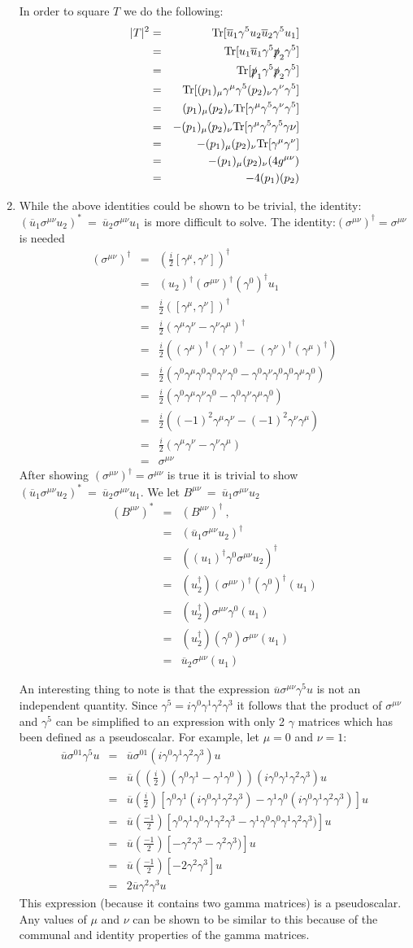 \documentclass[12pt]{article}
\def \bea{\begin{eqnarray}}
\def \eea{\end{eqnarray}}
\def \Tr{{\rm Tr}}
\def \nn{\nonumber}
\def \nl{\nn \\}
\def \ou{\overline{u}}
\def \ga{\gamma}
\def \si{\sigma}
\begin{document}
\begin{enumerate}
In order to square $T$ we do the following:
\bea
|T|^2&=& \Tr[\ou_1 \ga^5 u_2\ou_2 \ga^5 u_1] \\
&=& \Tr[u_1 \ou_1 \ga^5 \slashed{p}_2 \ga^5] \nl
&=& \Tr[\slashed{p}_1 \ga^5 \slashed{p}_2 \ga^5] \nl
&=& \Tr[(p_1)_\mu \ga^\mu \ga^5 (p_2)_\nu \ga^\nu \ga^5] \nl
&=& (p_1)_\mu(p_2)_\nu \Tr[\ga^\mu\ga^5\ga^\nu\ga^5] \nl
&=& -(p_1)_\mu(p_2)_\nu \Tr[\ga^\mu\ga^5\ga^5\ga\nu]\nl
&=& -(p_1)_\mu(p_2)_\nu \Tr[\ga^\mu\ga^\nu]\nl
&=& -(p_1)_\mu(p_2)_\nu (4g^{\mu\nu})\nl
&=& -4(p_1)(p_2) \nl
\eea

\item While the above identities could be shown to be trivial, the identity: $(\ou_1 \si^{\mu\nu} u_2)^* ~=~\ou_2 \si^{\mu\nu} u_1$ is more difficult to solve. The identity:$(\si^{\mu\nu})^\dag =\si^{\mu\nu}$ is needed
\bea
(\si^{\mu\nu})^\dag &=& (\frac{i}{2}[\ga^\mu,\ga^\nu])^\dag \\
&=&(u_2)^\dag (\si^{\mu\nu})^\dag (\ga^0)^\dag u_1 \nl
&=& \frac{i}{2}([\ga^\mu,\ga^\nu])^\dag\nl
&=& \frac{i}{2}(\ga^\mu\ga^\nu-\ga^\nu\ga^\mu)^\dag \nl
&=& \frac{i}{2}((\ga^\mu)^\dag(\ga^\nu)^\dag-(\ga^\nu)^\dag(\ga^\mu)^\dag) \nl
&=& \frac{i}{2}(\ga^0\ga^\mu\ga^0\ga^0\ga^\nu\ga^0-\ga^0\ga^\nu\ga^0\ga^0\ga^\mu\ga^0)\nl
&=& \frac{i}{2}(\ga^0\ga^\mu\ga^\nu\ga^0-\ga^0\ga^\nu \ga^\mu\ga^0)\nl
&=& \frac{i}{2}((-1)^2\ga^\mu\ga^\nu-(-1)^2\ga^\nu \ga^\mu) \nl
&=& \frac{i}{2}(\ga^\mu\ga^\nu-\ga^\nu \ga^\mu)\nl
&=& \si^{\mu\nu}
\eea
After showing $(\si^{\mu\nu})^\dag =\si^{\mu\nu}$ is true it is trivial to show $(\ou_1 \si^{\mu\nu} u_2)^* ~=~\ou_2 \si^{\mu\nu} u_1$.
We let $B^{\mu\nu} ~=~ \ou_1 \si^{\mu\nu} u_2$
\bea
(B^{\mu\nu})^* &=& (B^{\mu\nu})^\dag ~,~~ \\
&=& (\ou_1 \si^{\mu\nu} u_2)^\dag \nl
&=& ((u_1)^\dag \ga^0 \si^{\mu\nu} u_2)^\dag \nl
&=& (u_2^\dag)(\si^{\mu\nu})^\dag (\ga^0)^\dag(u_1)\nl
&=& (u_2^\dag)\si^{\mu\nu}\ga^0(u_1)\nl
&=& (u_2^\dag)(\ga^0)\si^{\mu\nu}(u_1)\nl
&=& \ou_2 \si^{\mu\nu}(u_1)
\eea

An interesting thing to note is that the expression $\ou \si^{\mu\nu} \ga^5 u$ is not an independent quantity. Since $\ga^5 =i\ga^0\ga^1\ga^2\ga^3$ it follows that the product of $\si^{\mu\nu}$ and $\ga^5$ can be simplified to an expression with only 2 $\ga$ matrices which has been defined as a pseudoscalar. For example, let $\mu =0$ and $\nu=1$:
\bea
\ou \si^{01} \ga^5 u &=& \ou \si^{01} (i\ga^0\ga^1\ga^2\ga^3) u \\
&=&  \ou ((\frac{i}{2})(\ga^0\ga^1 -\ga^1\ga^0)) (i\ga^0\ga^1\ga^2\ga^3) u \nl
&=&  \ou (\frac{i}{2})[\ga^0\ga^1(i\ga^0\ga^1\ga^2\ga^3) -\ga^1\ga^0(i\ga^0\ga^1\ga^2\ga^3)] u \nl
&=&  \ou (\frac{-1}{2})[\ga^0\ga^1\ga^0\ga^1\ga^2\ga^3 -\ga^1\ga^0\ga^0\ga^1\ga^2\ga^3)] u \nl
&=& \ou (\frac{-1}{2})[-\ga^2\ga^3 -\ga^2\ga^3)] u\nl
&=& \ou (\frac{-1}{2})[-2\ga^2\ga^3] u\nl
&=& 2\ou \ga^2\ga^3 u
\eea
This expression (because it contains two gamma matrices) is a pseudoscalar. Any values of $\mu$ and $\nu$ can be shown to be similar to this because of the communal and identity properties of the gamma matrices.


\end{enumerate}
\end{document}

